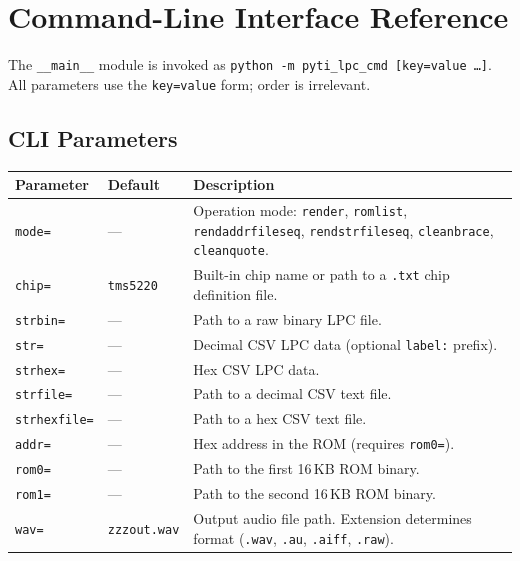 \documentclass[10pt]{article}
\begin{document}
\clearpage
\section{Command-Line Interface Reference}
\label{app:cli}

The \texttt{\_\_main\_\_} module is invoked as
\texttt{python~-m~pyti\_lpc\_cmd~[key=value~\ldots]}.
All parameters use the \texttt{key=value} form; order is irrelevant.

\subsection{CLI Parameters}

\begin{center}
\begin{tabular}{p{2.8cm}p{2.1cm}>{\raggedright\arraybackslash}p{7.4cm}}
\toprule
Parameter & Default & Description \\
\midrule
\texttt{mode=}      & ---    & Operation mode: \texttt{render}, \texttt{romlist},
                               \texttt{rendaddrfileseq}, \texttt{rendstrfileseq},
                               \texttt{cleanbrace}, \texttt{cleanquote}. \\
\texttt{chip=}      & \texttt{tms5220} & Built-in chip name or path to a
                               \texttt{.txt} chip definition file. \\
\texttt{strbin=}    & ---    & Path to a raw binary LPC file. \\
\texttt{str=}       & ---    & Decimal CSV LPC data (optional \texttt{label:} prefix). \\
\texttt{strhex=}    & ---    & Hex CSV LPC data. \\
\texttt{strfile=}   & ---    & Path to a decimal CSV text file. \\
\texttt{strhexfile=}& ---    & Path to a hex CSV text file. \\
\texttt{addr=}      & ---    & Hex address in the ROM (requires \texttt{rom0=}). \\
\texttt{rom0=}      & ---    & Path to the first 16\,KB ROM binary. \\
\texttt{rom1=}      & ---    & Path to the second 16\,KB ROM binary. \\
\texttt{wav=}       & \texttt{zzzout.wav} & Output audio file path.
                               Extension determines format
                               (\texttt{.wav}, \texttt{.au}, \texttt{.aiff},
                               \texttt{.raw}). \\

\end{tabular}
\end{center}
\end{document}
